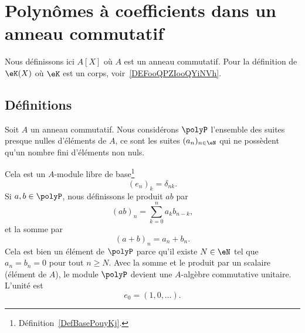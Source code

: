 \section{Polynômes à coefficients dans un anneau commutatif}
\label{SECooVMABooVdhbPo}


Nous définissons ici \( A[X]\) où \( A\) est un anneau commutatif. Pour la définition de \( \eK(X)\) où \( \eK\) est un corps, voir~\ref{DEFooQPZIooQYiNVh}.

\subsection{Définitions}

Soit \( A\) un anneau commutatif. Nous considérons \( \polyP\) l'ensemble des suites presque nulles d'éléments de \( A\), ce sont les suites \( (a_n)_{n\in\eN}\) qui ne possèdent qu'un nombre fini d'éléments non nuls.

Cela est un \( A\)-module libre de base\footnote{Définition~\ref{DefBasePouyKj}.}
\begin{equation}
    (e_n)_k=\delta_{nk}.
\end{equation}
Si \( a,b\in\polyP\), nous définissons le produit \( ab\) par
\begin{equation}    \label{EQooTNCSooKklisb}
    (ab)_n=\sum_{k=0}^na_kb_{n-k},
\end{equation}
et la somme par
\begin{equation}
    (a+b)_n=a_n+b_n.
\end{equation}
Cela est bien un élément de \( \polyP\) parce qu'il existe \( N\in\eN\) tel que \( a_n=b_n=0\) pour tout \( n\geq N\). Avec la somme et le produit par un scalaire (élément de \( A\)), le module \( \polyP\) devient une \( A\)-algèbre commutative unitaire. L'unité est
\begin{equation}
    e_0=(1,0,\ldots).
\end{equation}

